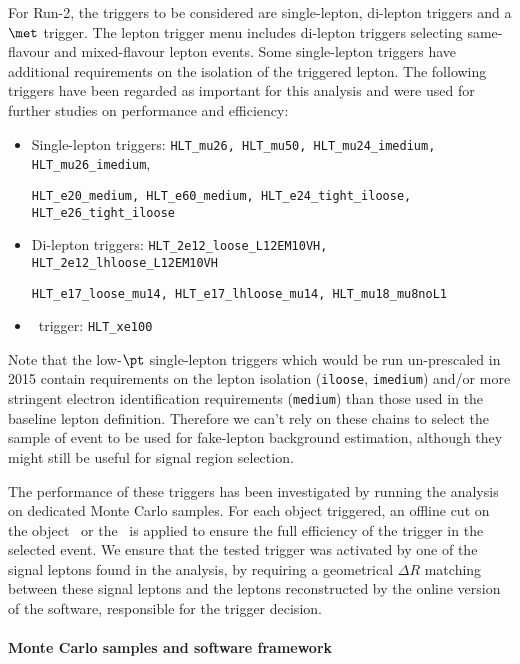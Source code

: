 For Run-2, the triggers to be considered are single-lepton, di-lepton triggers and a $\met$ trigger. The lepton trigger menu includes di-lepton triggers selecting same-flavour and mixed-flavour lepton events. Some single-lepton triggers have additional requirements on the isolation of the triggered lepton. The following triggers have been regarded as important for this analysis and were used for further studies on performance and efficiency:

\begin{itemize}
\item Single-lepton triggers: \texttt{HLT\_mu26, HLT\_mu50, HLT\_mu24\_imedium, HLT\_mu26\_imedium}, 

\texttt{HLT\_e20\_medium, HLT\_e60\_medium, HLT\_e24\_tight\_iloose, HLT\_e26\_tight\_iloose}

\item Di-lepton triggers: \texttt{HLT\_2e12\_loose\_L12EM10VH, HLT\_2e12\_lhloose\_L12EM10VH}

\texttt{HLT\_e17\_loose\_mu14, HLT\_e17\_lhloose\_mu14, HLT\_mu18\_mu8noL1}

\item \met\ trigger: \texttt{HLT\_xe100}

\end{itemize}

Note that the low-$\pt$ single-lepton triggers which would be run un-prescaled in 2015 contain requirements on the lepton isolation ({\tt iloose}, {\tt imedium}) 
and/or more stringent electron identification requirements ({\tt medium}) than those used in the baseline lepton definition. 
Therefore we can't rely on these chains to select the sample of event to be used for fake-lepton background estimation, 
although they might still be useful for signal region selection.

The performance of these triggers has been investigated by running the analysis on dedicated Monte Carlo samples. 
For each object triggered, an offline cut on the object \pt\ or the \met\ is applied to ensure the full efficiency of the trigger in the selected event. 
We ensure that the tested trigger was activated by one of the signal leptons found in the analysis, 
by requiring a geometrical $\Delta R$ matching between these signal leptons 
and the leptons reconstructed by the online version of the software, responsible for the trigger decision. 


\paragraph{Monte Carlo samples and software framework}

